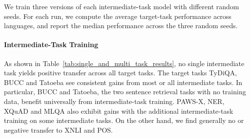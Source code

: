 \documentclass[11pt,a4paper]{article}
\begin{document}
We train three versions of each intermediate-task model with different random seeds. For each run, we compute the average target-task performance across languages, and report the median performance across the three random seeds.

\paragraph{Intermediate-Task Training}
As shown in Table~\ref{tab:single_and_multi_task_results}, no single intermediate task yields positive transfer across all target tasks. The target tasks TyDiQA, BUCC and Tatoeba see consistent gains from most or all  intermediate tasks. In particular, BUCC and Tatoeba, the two sentence retrieval tasks with no training data, benefit universally from intermediate-task training.
PAWS-X, NER, XQuAD and MLQA also exhibit gains with the additional intermediate-task training on some intermediate tasks. 
On the other hand, we find generally no or negative transfer to XNLI and POS.
\end{document}
